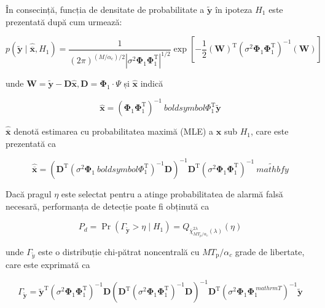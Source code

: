\documentclass[10pt]{report}
\begin{document}
În consecință, funcția de densitate de probabilitate a \(\tilde{\mathbf{y}}\) în ipoteza \(H_{1}\) este prezentată după cum urmează:


\begin{equation}
    p\left(\widetilde{\mathbf{y}} \mid \widehat{\overline{\mathbf{x}}}, H_{1}\right)=\frac{1}{(2 \pi)^{ \left(M / \alpha_{\mathrm{c}}\right) / 2}\left|\sigma^{2} \boldsymbol{\Phi}_{1} \boldsymbol{\Phi}_{1}^ {\mathrm{T}}\right|^{1 / 2}} \exp \left[-\frac{1}{2}(\mathbf{W})^{\mathrm{T}}\left(\sigma^{2} \boldsymbol{\Phi}_{1} \boldsymbol{\Phi}_{1}^{\mathrm{T}}\right)^{-1}(\mathbf{W})\right ]
\end{equation}


unde \(\mathbf{W}=\widetilde{\mathbf{y}}-\mathbf{D} \widehat{\mathbf{x}}, \mathbf{D}=\boldsymbol{\Phi}_{1} \cdot \Psi\) și \(\widehat{\mathbf{x}}\) indică


\begin{equation}
    \widehat{\mathbf{x}}=\left(\boldsymbol{\Phi}_{1} \boldsymbol{\Phi}_{1}^{\mathrm{T}}\right)^{-1} \ boldsymbol{\Phi}_{1}^{\mathrm{T}} \tilde{\mathbf{y}}
\end{equation}


\(\widehat{\overline{\mathbf{x}}}\) denotă estimarea cu probabilitatea maximă (MLE) a \(\mathbf{x}\) sub \(H_{1}\), care este prezentată ca


\begin{equation}
    \widehat{\overline{\mathbf{x}}}=\left(\mathbf{D}^{\mathrm{T}}\left(\sigma^{2} \boldsymbol{\Phi}_{1} \ boldsymbol{\Phi}_{1}^{\mathrm{T}}\right)^{-1} \mathbf{D}\right)^{-1} \mathbf{D}^{\mathrm{T} }\left(\sigma^{2} \boldsymbol{\Phi}_{1} \boldsymbol{\Phi}_{1}^{\mathrm{T}}\right)^{-1} \tilde{\ mathbf{y}}
\end{equation}


Dacă pragul \(\eta\) este selectat pentru a atinge probabilitatea de alarmă falsă necesară, performanța de detecție poate fi obținută ca


\begin{equation}
    P_{d}=\operatorname{Pr}\left(\Gamma_{\tilde{\mathbf{y}}}>\eta \mid H_{1}\right)=Q_{\bar{\chi}_{M T_{p} / \alpha_{c}}^{2 \lambda}(\lambda)}(\eta)
\end{equation}


unde \(\Gamma_{\tilde{y}}\) este o distribuție chi-pătrat noncentrală cu \(M T_{\mathrm{p}} / \alpha_{c}\) grade de libertate, care este exprimată ca


\begin{equation}
    \Gamma_{\tilde{\mathbf{y}}}=\tilde{\mathbf{y}}^{\mathrm{T}}\left(\sigma^{2} \boldsymbol{\Phi}_{1} \boldsymbol{\Phi}_{1}^{\mathrm{T}}\right)^{-1} \mathbf{D}\left(\mathbf{D}^{\mathrm{T}}\left( \sigma^{2} \boldsymbol{\Phi}_{1} \boldsymbol{\Phi}_{1}^{\mathrm{T}}\right)^{-1} \mathbf{D}\right) ^{-1} \mathbf{D}^{\mathrm{T}}\left(\sigma^{2} \boldsymbol{\Phi}_{1} \boldsymbol{\Phi}_{1}^{\ mathrm{T}}\right)^{-1} \tilde{\mathbf{y}}
\end{equation}
\end{document}
